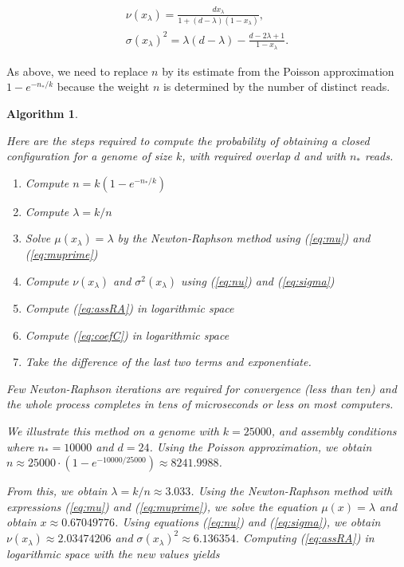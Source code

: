 \documentclass{article}
\newtheorem{algorithm}{Algorithm}
\begin{document}
\begin{gather}
\label{eq:nu} %
\nu(x_\lambda) = \frac{dx_\lambda}{1+(d-\lambda)(1-x_\lambda)}, \\
\label{eq:sigma} %
\sigma(x_\lambda)^2 = \lambda(d-\lambda) -
  \frac{d-2\lambda+1}{1-x_\lambda}.
\end{gather}

As above, we need to replace $n$ by its estimate from the Poisson
approximation $1-e^{-n_*/k}$ because the weight $n$ is determined by the
number of distinct reads.


\begin{algorithm}
\label{alg:closure}

Here are the steps required to compute the probability of obtaining a
closed configuration for a genome of size $k$, with required overlap $d$
and with $n_*$ reads.

\begin{enumerate}
\item Compute $n = k(1-e^{-n_*/k})$
\item Compute $\lambda = k/n$
\item Solve $\mu(x_\lambda) = \lambda$ by the Newton-Raphson method using
(\ref{eq:mu}) and (\ref{eq:muprime})
\item Compute $\nu(x_\lambda)$ and $\sigma^2(x_\lambda)$ using
(\ref{eq:nu}) and (\ref{eq:sigma})
\item Compute (\ref{eq:assRA}) in logarithmic space
\item Compute (\ref{eq:coefC}) in logarithmic space
\item Take the difference of the last two terms and exponentiate.
\end{enumerate}

Few Newton-Raphson iterations are required for convergence (less than ten)
and the whole process completes in tens of microseconds or less on most
computers.

We illustrate this method on a genome with $k = 25000$, and assembly
conditions where $n_* = 10000$ and $d=24$. Using the Poisson
approximation, we obtain $n \approx 25000 \cdot (1-e^{-10000/25000})
\approx 8241.9988$.

From this, we obtain $\lambda = k/n \approx 3.033$. Using the
Newton-Raphson method with expressions (\ref{eq:mu}) and
(\ref{eq:muprime}), we solve the equation $\mu(x) = \lambda$ and obtain $x
\approx 0.67049776$. Using equations (\ref{eq:nu}) and (\ref{eq:sigma}),
we obtain $\nu(x_\lambda) \approx 2.03474206$ and $\sigma(x_\lambda)^2
\approx 6.136354$. Computing (\ref{eq:assRA}) in logarithmic space with
the new values yields


\end{algorithm}
\end{document}
